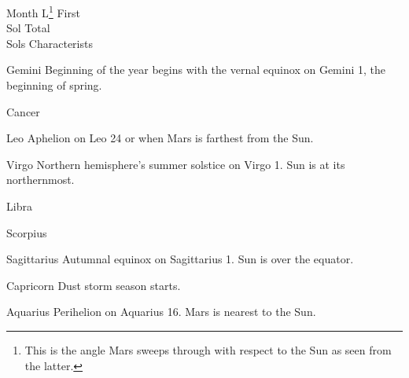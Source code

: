 {
    \bTABLE[split=repeat,option=stretch]
    \setupTABLE[column][5]
        [width=.52\textwidth,
        align=yes]
    \setupTABLE[row][each][align=center]
    \setupTABLE[5][1][align=center]

\bTABLEhead
    \bTR[bottomframe=on]
      \bTH  Month \eTH
      \bTH  L\footnote{This is the angle Mars sweeps through with respect to the Sun as seen from the latter.} \eTH
      \bTH  First\\Sol \eTH
      \bTH  Total\\Sols \eTH
      \bTH  Characterists \eTH
    \eTR
\eTABLEhead

\bTABLEbody
    \bTR
      \bTC Gemini \eTC
      \bTC \math{[0^{\circ}, 30^{\circ})}\eTC
       \eTC
       \eTC
      \bTC Beginning of the year begins with the vernal equinox on Gemini 1, the beginning of spring.\eTC
    \eTR
    
    \bTR
      \bTC Cancer \eTC
      \bTC \math{[30^{\circ}, 60^{\circ})} \eTC
       \eTC
       \eTC
      \bTC  \eTC
    \eTR
    
    \bTR
      \bTC Leo \eTC
      \bTC \math{[60^{\circ}, 90^{\circ})} \eTC
       \eTC
       \eTC
      \bTC Aphelion on Leo 24 or when Mars is farthest from the Sun.\eTC
    \eTR
    
    \bTR
      \bTC Virgo \eTC
      \bTC \math{[90^{\circ}, 120^{\circ})} \eTC
       \eTC
       \eTC
      \bTC Northern hemisphere's summer solstice on Virgo 1. Sun is at its northernmost.\eTC
    \eTR
    
    \bTR
      \bTC Libra \eTC
      \bTC \math{[120^{\circ}, 150^{\circ})} \eTC
       \eTC
       \eTC
      \bTC  \eTC
    \eTR
    
    \bTR
      \bTC Scorpius \eTC
      \bTC \math{[150^{\circ}, 180^{\circ})} \eTC
       \eTC
       \eTC
      \bTC  \eTC
    \eTR
    
    \bTR
      \bTC Sagittarius \eTC
      \bTC \math{[180^{\circ}, 210^{\circ})} \eTC
       \eTC
       \eTC
      \bTC Autumnal equinox on Sagittarius 1. Sun is over the equator.\eTC
    \eTR
    
    \bTR
      \bTC Capricorn \eTC
      \bTC \math{[210^{\circ}, 240^{\circ})} \eTC
       \eTC
       \eTC
      \bTC Dust storm season starts. \eTC
    \eTR
    
    \bTR
      \bTC Aquarius \eTC
      \bTC \math{[240^{\circ}, 270^{\circ})} \eTC
       \eTC
       \eTC
      \bTC Perihelion on Aquarius 16. Mars is nearest to the Sun.\eTC
    \eTR
    
}
